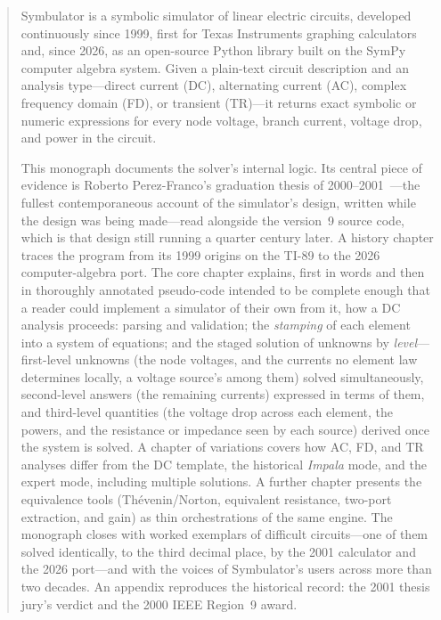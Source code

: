 \documentclass[11pt,oneside]{report}
\begin{document}
\begin{abstract}
\noindent
Symbulator is a symbolic simulator of linear electric circuits,
developed continuously since 1999, first for Texas Instruments
graphing calculators and, since 2026, as an open-source Python library
built on the SymPy computer algebra system. Given a plain-text circuit
description and an analysis type---direct current (DC), alternating
current (AC), complex frequency domain (FD), or transient (TR)---it
returns exact symbolic or numeric expressions for every node voltage,
branch current, voltage drop, and power in the circuit.

This monograph documents the solver's internal logic. Its central
piece of evidence is Roberto Perez-Franco's graduation thesis of
2000--2001~\cite{thesis2000}---the fullest contemporaneous account of
the simulator's design, written while the design was being made---read
alongside the version~9 source code, which is that design still
running a quarter century later. A history chapter traces the program
from its 1999 origins on the TI-89 to the 2026 computer-algebra port.
The core chapter explains, first in words and then in thoroughly
annotated pseudo-code intended to be complete enough that a reader
could implement a simulator of their own from it, how a DC analysis
proceeds: parsing and validation; the \emph{stamping} of each element
into a system of equations; and the staged solution of unknowns by
\emph{level}---first-level unknowns (the node voltages, and the
currents no element law determines locally, a voltage source's among
them) solved simultaneously, second-level answers (the remaining
currents) expressed in terms of them, and third-level quantities
(the voltage drop across each element, the powers, and the
resistance or impedance seen by each source) derived once the system
is solved. A
chapter of variations covers how AC, FD, and TR analyses differ from
the DC template, the historical \emph{Impala} mode, and the expert
mode, including multiple solutions. A further chapter presents the
equivalence tools (Th\'evenin/Norton, equivalent resistance, two-port
extraction, and gain) as thin orchestrations of the same engine. The
monograph closes with worked exemplars of difficult circuits---one of
them solved identically, to the third decimal place, by the 2001
calculator and the 2026 port---and with the voices of Symbulator's
users across more than two decades. An appendix reproduces the
historical record: the 2001 thesis jury's verdict and the 2000 IEEE
Region~9 award.
\end{abstract}
\end{document}
